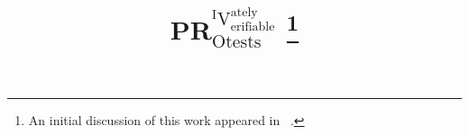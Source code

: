 \title[PRIVO\@: securely and PRIVately Verificable PROtests]{%
  PR$^{^{\text{I}}\text{V}^{\text{ately}}_\text{erifiable}}_{\text{Otests}}$%
  \thanks{%
    An initial discussion of this work appeared in 
    ~\cite{FutureProtests}.
  }
}

\maketitle


\begin{abstract}
  
\end{abstract}











